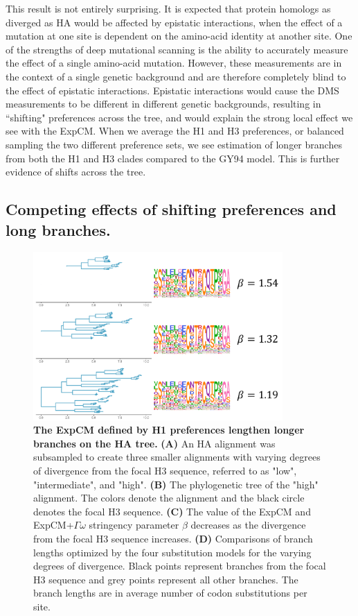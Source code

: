 \documentclass[11pt]{article}
\begin{document}
This result is not entirely surprising. 
It is expected that protein homologs as diverged as HA would be affected by epistatic interactions, when the effect of a mutation at one site is dependent on the amino-acid identity at another site. 
One of the strengths of deep mutational scanning is the ability to accurately measure the effect of a single amino-acid mutation. 
However, these measurements are in the context of a single genetic background and are therefore completely blind to the effect of epistatic interactions. 
Epistatic interactions would cause the DMS measurements to be different in different genetic backgrounds, resulting in ``shifting" preferences across the tree, and would explain the strong local effect we see with the ExpCM. 
When we average the H1 and H3 preferences, or balanced sampling the two different preference sets, we see estimation of longer branches from both the H1 and H3 clades compared to the GY94 model.  
This is further evidence of shifts across the tree. 

\subsection*{Competing effects of shifting preferences and long branches.}

\begin{figure}[H]
\centerline{\includegraphics[width=0.85\textwidth]{figures/doud_compete_2}}
\caption{\label{fig:doud_compete}
\textbf{The ExpCM defined by H1 preferences lengthen longer branches on the HA tree.} 
\textbf{(A)} An HA alignment was subsampled to create three smaller alignments with varying degrees of divergence from the focal H3 sequence, referred to as "low", "intermediate", and "high". 
\textbf{(B)} The phylogenetic tree of the "high" alignment. 
The colors denote the alignment and the black circle denotes the focal H3 sequence. 
\textbf{(C)} The value of the ExpCM and ExpCM+$\Gamma\omega$ stringency parameter $\beta$ decreases as the divergence from the focal H3 sequence increases. 
\textbf{(D)} Comparisons of branch lengths optimized by the four substitution models for the varying degrees of divergence. 
Black points represent branches from the focal H3 sequence and grey points represent all other branches.  
The branch lengths are in average number of codon substitutions per site. 
}
\end{figure}
\end{document}
